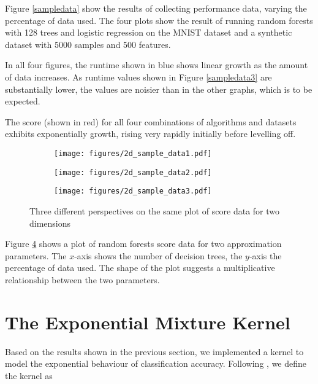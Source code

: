 \documentclass[a4paper,12pt,twoside,openright]{report}
\begin{document}
Figure \ref{sampledata} show the results of collecting performance data, varying the percentage of data used. The four plots show the result of running random forests with 128 trees and logistic regression on the MNIST dataset and a synthetic dataset with 5000 samples and 500 features.

In all four figures, the runtime shown in blue shows linear growth as the amount of data increases. As runtime values shown in Figure \ref{sampledata3} are substantially lower, the values are noisier than in the other graphs, which is to be expected.

The score (shown in red) for all four combinations of algorithms and datasets exhibits exponentially growth, rising very rapidly initially before levelling off.


\begin{figure}
\centering
\begin{subfigure}{.33\textwidth}
  \centering
  \texttt{[image: figures/2d\_sample\_data1.pdf]}
  \caption{}
  \label{2d_1}
\end{subfigure}%
\begin{subfigure}{.33\textwidth}
  \centering
  \texttt{[image: figures/2d\_sample\_data2.pdf]}
  \caption{}
  \label{2d_2}
\end{subfigure}
\begin{subfigure}{.33\textwidth}
  \centering
  \texttt{[image: figures/2d\_sample\_data3.pdf]}
  \caption{}
  \label{2d_3}
\end{subfigure}
\caption{Three different perspectives on the same plot of score data for two dimensions}
\label{2d}
\end{figure}


Figure \ref{2d} shows a plot of random forests score data for two approximation parameters. The $x$-axis shows the number of decision trees, the $y$-axis the percentage of data used. The shape of the plot suggests a multiplicative relationship between the two parameters.


\section{The Exponential Mixture Kernel}

Based on the results shown in the previous section, we implemented a kernel to model the exponential behaviour of classification accuracy. Following \cite{2014arXiv1406.3896S}, we define the kernel as
\end{document}
